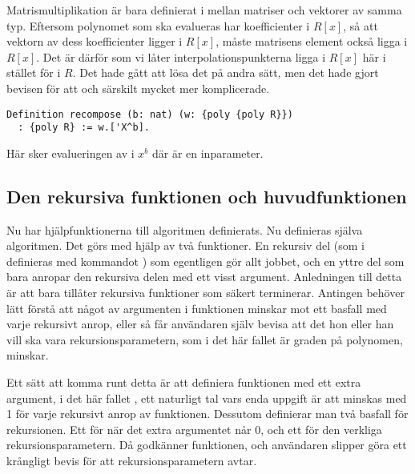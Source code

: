 Matrismultiplikation är bara definierat i \ssr{} mellan matriser och vektorer av
samma typ. Eftersom polynomet  som ska evalueras har koefficienter i
$R[x]$, så att vektorn av dess koefficienter ligger i $R[x]$, måste matrisens
element också ligga i $R[x]$. Det är därför som vi låter
interpolationspunkterna ligga i $R[x]$ här i stället för i $R$. Det hade gått
att lösa det på andra sätt, men det hade gjort bevisen för att  och
särskilt  mycket mer komplicerade.

\begin{lstlisting}
Definition recompose (b: nat) (w: {poly {poly R}})
  : {poly R} := w.['X^b].
\end{lstlisting}
Här sker evalueringen av  i $x^b$ där  är en inparameter.

\subsection{Den rekursiva funktionen och huvudfunktionen}
\label{sec:formrec}

Nu har hjälpfunktionerna till algoritmen definierats. Nu definieras själva
algoritmen. Det görs med hjälp av två funktioner. En rekursiv del (som i \coq{}
definieras med kommandot ) som egentligen gör allt jobbet, och en
yttre del som bara anropar den rekursiva delen med ett visst argument.
Anledningen till detta är att \coq{} bara tillåter rekursiva funktioner som
säkert terminerar. Antingen behöver \coq{} lätt förstå att något av argumenten
i funktionen minskar mot ett basfall med varje rekursivt anrop, eller så får
användaren själv bevisa att det hon eller han vill ska vara
rekursionsparametern, som i det här fallet är graden på polynomen, minskar.

Ett sätt att komma runt detta är att definiera funktionen med ett extra
argument, i det här fallet , ett naturligt tal vars enda uppgift är att
minskas med 1 för varje rekursivt anrop av funktionen. Dessutom definierar man
två basfall för rekursionen. Ett för när det extra argumentet  når 0,
och ett för den verkliga rekursionsparametern. Då godkänner \coq{} funktionen,
och användaren slipper göra ett krångligt bevis för att rekursionsparametern
avtar.

